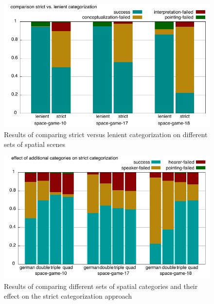 \begin{figure}
\begin{center}
\includegraphics[width=.8\columnwidth]{figs/apply-filter-comparison}
\end{center}
\caption[Comparison of filter type semantics and apply semantics]
{Results of comparing strict versus lenient categorization
on different sets of spatial scenes}
\label{f:apply-filter-comparison}
\end{figure}


\begin{figure}
\begin{center}
\includegraphics[width=.8\columnwidth]{figs/filter-more-categories.pdf}
\end{center}
\caption[Effect of additional categories on strict categorization]
{Results of comparing different sets of spatial categories and their 
effect on the strict categorization approach}
\label{f:filter-increased-categories}
\end{figure}

